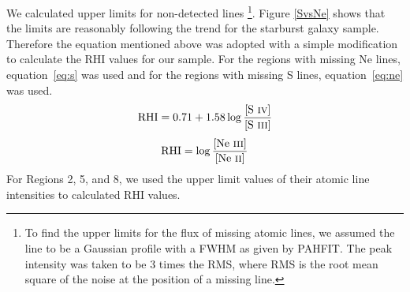 We calculated upper limits for non-detected lines \footnote{To find the upper limits for the flux of missing atomic lines, we assumed the line to be a 
Gaussian profile with a FWHM as given by PAHFIT. The peak intensity was taken to be 3 times the RMS, where RMS is the root mean square of 
the noise at the position of a missing line.}. Figure \ref{SvsNe}  shows that the limits are reasonably following the trend for the starburst galaxy sample. 
Therefore the equation mentioned above was adopted with a simple modification to calculate the RHI values for our sample. For the regions with missing Ne lines, 
equation~\ref{eq:s} was used and for the regions with missing S lines, equation~\ref{eq:ne} was used. 
\begin{equation}
{\rm RHI} = 0.71 + 1.58\log\frac{\textrm{[S~{\sc iv}]}}{\textrm{[S~{\sc iii}]}}
\label{eq:s}	
\end{equation}
\begin{equation}
{\rm RHI} = \log\frac{\textrm{[Ne~{\sc iii}]}}{\textrm{[Ne~{\sc ii}]}}
\label{eq:ne}	
\end{equation}
For Regions 2, 5, and 8, we used the upper limit values of their atomic line intensities to calculated RHI values.

